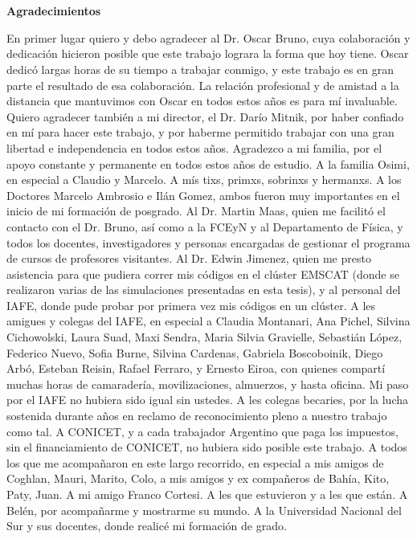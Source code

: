 \pagestyle{empty}
\chapter*{}

\begin{center}
\begin{large}
\textbf{Agradecimientos}
\end{large}
\end{center}

\vspace{1cm}
En primer lugar quiero y debo agradecer al Dr. Oscar Bruno, cuya 
colaboración y dedicación hicieron posible que 
este trabajo lograra la forma que hoy tiene. Oscar dedicó largas 
horas de su tiempo a trabajar conmigo, 
y este trabajo es en gran parte el resultado de esa colaboración. 
La relación profesional y de amistad a la distancia que mantuvimos 
con Oscar en todos estos años es para mí invaluable. 
Quiero agradecer también a mi director, el Dr. Darío Mitnik, por 
haber confiado en mí para hacer este trabajo, y por haberme permitido 
trabajar con una gran libertad e independencia en todos estos años. 
Agradezco a mi familia, por el apoyo constante y permanente 
en todos estos años de estudio. A la familia Osimi, en especial a 
Claudio y Marcelo. A mís tixs, primxs, sobrinxs y hermanxs.
A los Doctores Marcelo Ambrosio e Ilán Gomez, 
ambos fueron muy importantes en el inicio de mi formación de posgrado. 
Al Dr. Martin Maas, quien me facilitó el contacto con el Dr. Bruno, 
así como a la FCEyN y al Departamento de Física, y todos los docentes, 
investigadores y personas encargadas de gestionar el programa de cursos de profesores visitantes. 
Al Dr. Edwin 
Jimenez, quien me presto asistencia para que pudiera correr mis códigos 
en el clúster EMSCAT (donde se realizaron varias de las simulaciones 
presentadas en esta tesis), y al personal del IAFE, 
donde pude probar por primera vez mis códigos en un clúster.
 A les amigues y colegas del IAFE, en especial a 
Claudia Montanari, Ana Pichel, Silvina Cichowolski, Laura Suad, Maxi Sendra, Maria Silvia Gravielle, Sebastián López, 
Federico Nuevo, Sofia Burne, Silvina Cardenas, Gabriela Boscoboinik, Diego Arbó, Esteban Reisin, Rafael Ferraro,  y Ernesto Eiroa, con quienes 
compartí muchas horas de camaradería, movilizaciones, almuerzos, y hasta oficina. 
Mi paso por el IAFE no hubiera sido igual sin ustedes. 
A les colegas becaries, por la lucha sostenida durante años en reclamo de 
reconocimiento pleno a nuestro trabajo como tal. 
A CONICET, y a cada trabajador Argentino que paga los impuestos, 
sin el financiamiento de CONICET, no hubiera sido posible este trabajo. 
A todos los que me acompañaron en este largo recorrido, 
en especial a mis amigos de Coghlan, Mauri, Marito, Colo, a mis amigos y 
ex compañeros de Bahía, Kito, Paty, Juan. A mi amigo Franco Cortesi. A les que estuvieron y a les que están. A Belén, 
por acompañarme y mostrarme su mundo. A la Universidad Nacional del Sur y sus 
docentes, donde realicé mi formación de grado.

